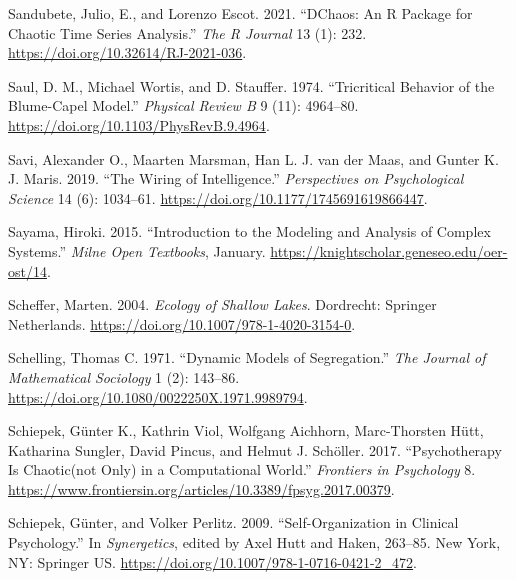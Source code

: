 \documentclass[
  a4paper,
  DIV=11,
  numbers=noendperiod]{scrreprt}
\newlength{\cslhangindent}
\newlength{\cslentryspacingunit} %
\newenvironment{CSLReferences}[2] %
 {%
  \setlength{\parindent}{0pt}
  \ifodd #1
  \let\oldpar\par
  \def\par{\hangindent=\cslhangindent\oldpar}
  \fi
  \setlength{\parskip}{#2\cslentryspacingunit}
 }%
 {}
\begin{document}
\begin{CSLReferences}{1}{0}
\leavevmode{}%
Sandubete, Julio, E., and Lorenzo Escot. 2021. {``{DChaos}: {An R
Package} for {Chaotic Time Series Analysis}.''} \emph{The R Journal} 13
(1): 232. \url{https://doi.org/10.32614/RJ-2021-036}.

\leavevmode{}%
Saul, D. M., Michael Wortis, and D. Stauffer. 1974. {``Tricritical
Behavior of the {Blume-Capel} Model.''} \emph{Physical Review B} 9 (11):
4964--80. \url{https://doi.org/10.1103/PhysRevB.9.4964}.

\leavevmode{}%
Savi, Alexander O., Maarten Marsman, Han L. J. van der Maas, and Gunter
K. J. Maris. 2019. {``The {Wiring} of {Intelligence}.''}
\emph{Perspectives on Psychological Science} 14 (6): 1034--61.
\url{https://doi.org/10.1177/1745691619866447}.

\leavevmode{}%
Sayama, Hiroki. 2015. {``Introduction to the Modeling and Analysis of
Complex Systems.''} \emph{Milne Open Textbooks}, January.
\url{https://knightscholar.geneseo.edu/oer-ost/14}.

\leavevmode{}%
Scheffer, Marten. 2004. \emph{Ecology of {Shallow Lakes}}. {Dordrecht}:
{Springer Netherlands}. \url{https://doi.org/10.1007/978-1-4020-3154-0}.

\leavevmode{}%
Schelling, Thomas C. 1971. {``Dynamic Models of Segregation.''}
\emph{The Journal of Mathematical Sociology} 1 (2): 143--86.
\url{https://doi.org/10.1080/0022250X.1971.9989794}.

\leavevmode{}%
Schiepek, Günter K., Kathrin Viol, Wolfgang Aichhorn, Marc-Thorsten
Hütt, Katharina Sungler, David Pincus, and Helmut J. Schöller. 2017.
{``Psychotherapy Is Chaotic{\textemdash}(not Only) in a Computational
World.''} \emph{Frontiers in Psychology} 8.
\url{https://www.frontiersin.org/articles/10.3389/fpsyg.2017.00379}.

\leavevmode{}%
Schiepek, Günter, and Volker Perlitz. 2009. {``Self-{Organization} in
{Clinical Psychology}.''} In \emph{Synergetics}, edited by Axel Hutt and
Haken, 263--85. {New York, NY}: {Springer US}.
\url{https://doi.org/10.1007/978-1-0716-0421-2_472}.


\end{CSLReferences}
\end{document}
